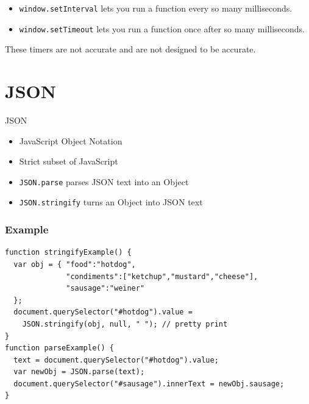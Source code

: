 \documentclass[../CMPUT-404-Notes.tex]{subfiles}
\begin{document}
\begin{itemize}
    \item \texttt{window.setInterval} lets you run a function every so many milliseconds.
    \item \texttt{window.setTimeout} lets you run a function once after so many milliseconds.
\end{itemize}

\begin{Note}
    These timers are not accurate and are not designed to be accurate.
\end{Note}

\section{JSON}
\begin{DndSidebar}[color=PhbLightGreen]{JSON}
    \begin{itemize}
        \item JavaScript Object Notation
        \item Strict subset of JavaScript
        \item \texttt{JSON.parse} parses JSON text into an Object
        \item \texttt{JSON.stringify} turns an Object into JSON text
    \end{itemize} 

\end{DndSidebar}

\subsubsection{Example}
\begin{verbatim}
function stringifyExample() {
  var obj = { "food":"hotdog", 
              "condiments":["ketchup","mustard","cheese"],
              "sausage":"weiner"
  };
  document.querySelector("#hotdog").value = 
    JSON.stringify(obj, null, " "); // pretty print
}
function parseExample() {
  text = document.querySelector("#hotdog").value;
  var newObj = JSON.parse(text); 
  document.querySelector("#sausage").innerText = newObj.sausage;
}
\end{verbatim}
\end{document}
